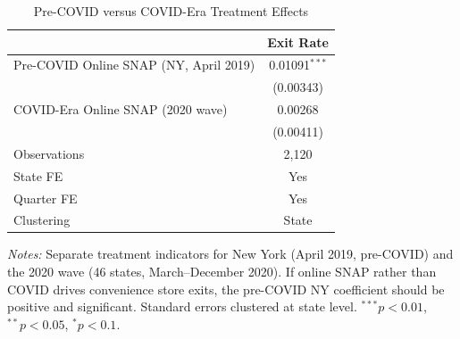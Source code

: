 \begin{table}[t]
\centering
\caption{Pre-COVID versus COVID-Era Treatment Effects}
\label{tab:het}
\begin{tabular}{lc}
\toprule
 & Exit Rate \\
\midrule
Pre-COVID Online SNAP (NY, April 2019) & 0.01091$^{***}$ \\
 & (0.00343) \\
COVID-Era Online SNAP (2020 wave) & 0.00268 \\
 & (0.00411) \\
\midrule
Observations & 2,120 \\
State FE & Yes \\
Quarter FE & Yes \\
Clustering & State \\
\bottomrule
\end{tabular}
\begin{tablenotes}
\item \textit{Notes:} Separate treatment indicators for New York (April 2019, pre-COVID) and the 2020 wave (46 states, March--December 2020). If online SNAP rather than COVID drives convenience store exits, the pre-COVID NY coefficient should be positive and significant. Standard errors clustered at state level. $^{***}p<0.01$, $^{**}p<0.05$, $^{*}p<0.1$.
\end{tablenotes}
\end{table}

